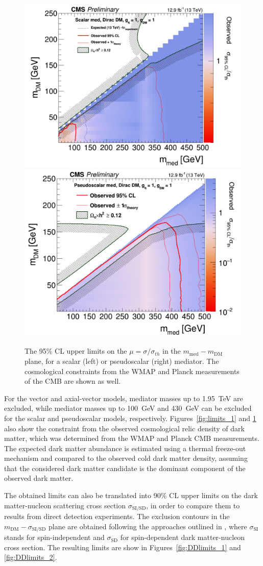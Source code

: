 \begin{figure}[ht]
  \centering
 \includegraphics[width=.49\textwidth]{scalarmed.png} 
 \includegraphics[width=.49\textwidth]{pseudoscalarmed.png} 
 \caption{The 95\% CL upper limits on the $\mu =  \sigma/\sigma_{th}$ in the  $m_{\mathrm{med}}-m_{\mathrm{DM}}$ plane, for a scalar (left) or pseudoscalar (right) mediator. The cosmological constraints from the WMAP and Planck measurements of the \ac{CMB} are shown as well.}
 \label{fig:limits_2}
\end{figure}

For the vector and axial-vector models, mediator masses up to \SI{1.95}{TeV} are excluded, while mediator masses up to \SI{100}{GeV} and \SI{430}{GeV} can be excluded for the scalar and pseudoscalar models, respectively. Figures~\ref{fig:limits_1} and \ref{fig:limits_2} also show the constraint from the observed cosmological relic density of dark matter, which was determined from the WMAP and Planck \ac{CMB} measurements. The expected dark matter abundance is estimated using a thermal freeze-out mechanism and compared to the observed cold dark matter density, assuming that the considered dark matter candidate is the dominant component of the observed dark matter.

The obtained limits can also be translated into 90\% CL upper limits on the dark matter-nucleon scattering cross section $\sigma_{\mathrm{SI/SD}}$, in order to compare them to results from direct detection experiments. The exclusion contours in the $m_{\mathrm{DM}}-\sigma_{\mathrm{SI/SD}}$ plane are obtained following the approaches outlined in \cite{Buchmueller:2014yoa, Kurylov:2003ra, Hisano:2010ct}, where $\sigma_{\mathrm{SI}}$ stands for spin-independent and $\sigma_{\mathrm{SD}}$ for spin-dependent dark matter-nucleon cross section. The resulting limits are show in Figures~\ref{fig:DDlimits_1} and \ref{fig:DDlimits_2}.

